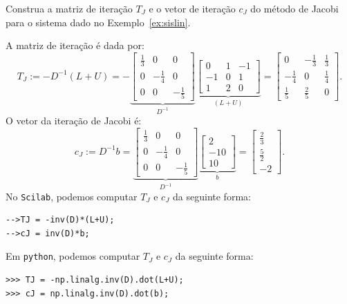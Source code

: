\begin{ex}
  Construa a matriz de iteração $T_J$ e o vetor de iteração $c_J$ do método de Jacobi para o sistema dado no Exemplo~\ref{ex:sislin}.
\end{ex}
\begin{sol}
  A matriz de iteração é dada por:
  \begin{equation}
    T_J := -D^{-1}(L + U) = -
    \underbrace{\begin{bmatrix}
      \frac{1}{3} & 0 & 0\\
      0 & -\frac{1}{4} & 0\\
      0 & 0 & -\frac{1}{5}
    \end{bmatrix}}_{D^{-1}}
  \underbrace{\begin{bmatrix}
    0 & 1 & -1\\
    -1 & 0 & 1\\
    1 & 2 & 0
  \end{bmatrix}}_{(L + U)} =
\begin{bmatrix}
  0 & -\frac{1}{3} & \frac{1}{3}\\
  -\frac{1}{4} & 0 & \frac{1}{4}\\
  \frac{1}{5} & \frac{2}{5} & 0
\end{bmatrix}.
  \end{equation}
O vetor da iteração de Jacobi é:
\begin{equation}
  c_J := D^{-1}b =
    \underbrace{\begin{bmatrix}
      \frac{1}{3} & 0 & 0\\
      0 & -\frac{1}{4} & 0\\
      0 & 0 & -\frac{1}{5}
    \end{bmatrix}}_{D^{-1}}
    \underbrace{\begin{bmatrix}
      2\\
      -10\\
      10
    \end{bmatrix}}_{b} =
    \begin{bmatrix}
      \frac{2}{3}\\
      \frac{5}{2}\\
      -2
    \end{bmatrix}.
\end{equation}
\ifisscilab
No \verb+Scilab+, podemos computar $T_J$ e $c_J$ da seguinte forma:
\begin{verbatim}
-->TJ = -inv(D)*(L+U);
-->cJ = inv(D)*b;
\end{verbatim}
\fi
\ifispython
Em \verb+python+, podemos computar $T_J$ e $c_J$ da seguinte forma:
\begin{verbatim}
>>> TJ = -np.linalg.inv(D).dot(L+U);
>>> cJ = np.linalg.inv(D).dot(b);
\end{verbatim}
\fi
\end{sol}

